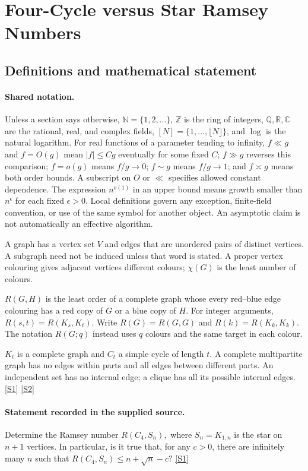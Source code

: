 \documentclass[11pt,a4paper]{article}
\newcommand{\N}{\mathbb{N}}
\newcommand{\Z}{\mathbb{Z}}
\newcommand{\Q}{\mathbb{Q}}
\newcommand{\R}{\mathbb{R}}
\newcommand{\C}{\mathbb{C}}
\newcommand{\sref}[2]{\hyperlink{source:#1:#2}{[S#2]}}
\begin{document}
\section{Four-Cycle versus Star Ramsey Numbers}\label{statement}


\subsection{Definitions and mathematical statement}

\paragraph{Shared notation.}Unless a section says otherwise, $\N=\{1,2,\ldots\}$,
$\Z$ is the ring of integers, $\Q,\R,\C$ are the rational, real, and complex
fields, $[N]=\{1,\ldots,\lfloor N\rfloor\}$, and $\log$ is the natural
logarithm. For real functions of a parameter tending to infinity,
$f\ll g$ and $f=O(g)$ mean $|f|\leq Cg$ eventually for some fixed $C$;
$f\gg g$ reverses this comparison; $f=o(g)$ means $f/g\to0$;
$f\sim g$ means $f/g\to1$; and $f\asymp g$ means both order bounds.
A subscript on $O$ or $\ll$ specifies allowed constant dependence.
The expression $n^{o(1)}$ in an upper bound means growth smaller than
$n^\epsilon$ for each fixed $\epsilon>0$. Local definitions govern any
exception, finite-field convention, or use of the same symbol for another
object. An asymptotic claim is not automatically an effective algorithm.



A graph has a vertex set $V$ and edges that are unordered pairs of distinct vertices. A subgraph need not be induced unless that word is stated. A proper vertex colouring gives adjacent vertices different colours; $\chi(G)$ is the least number of colours.

$R(G,H)$ is the least order of a complete graph whose every red--blue edge colouring has a red copy of $G$ or a blue copy of $H$. For integer arguments, $R(s,t)=R(K_s,K_t)$. Write $R(G)=R(G,G)$ and $R(k)=R(K_k,K_k)$. The notation $R(G;q)$ instead uses $q$ colours and the same target in each colour.

$K_t$ is a complete graph and $C_t$ a simple cycle of length $t$. A complete multipartite graph has no edges within parts and all edges between different parts. An independent set has no internal edge; a clique has all its possible internal edges. \sref{statement}{1} \sref{statement}{2}

\paragraph{Statement recorded in the supplied source.}
Determine the Ramsey number $ R(C_4,S_n), $ where $S_n=K_{1,n}$ is the star on $n+1$ vertices.
In particular, is it true that, for any $c>0$, there are infinitely many $n$ such that $ R(C_4,S_n)\leq n+\sqrt{n}-c? $ \sref{statement}{1}
\end{document}
